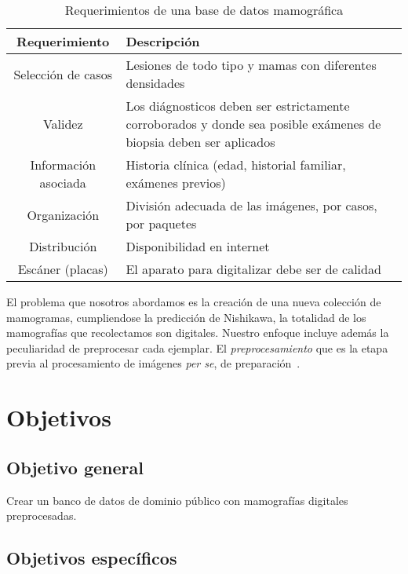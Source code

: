\begin{table}
  \caption[Requerimientos de una base de datos mamográfica]{Requerimientos de una base de datos mamográfica} 
  \label{features}
\begin{center}
{\small
    \begin{tabular}{c | >{\arraybackslash}m{3.5in}} 
    \hline 
    {\bf Requerimiento} & 
    {\bf Descripción} \\ 
    \hline
    Selección de casos   & Lesiones de todo tipo y mamas con diferentes densidades\\
    Validez              & Los diágnosticos deben ser estrictamente corroborados 
                           y donde sea posible exámenes de biopsia deben ser aplicados\\
    Información asociada & Historia clínica (edad, historial familiar, exámenes previos)\\
    Organización         & División adecuada de las imágenes, por casos, por paquetes\\
    Distribución         & Disponibilidad en internet\\
    Escáner (placas)     & El aparato para digitalizar debe ser de calidad\\
    \hline
    \end{tabular}
}
\end{center}
\end{table}

El problema que nosotros abordamos es la creación de una nueva colección de
mamogramas, cumpliendose la predicción de Nishikawa, la totalidad de los
mamografías que recolectamos son digitales. Nuestro enfoque incluye además la
peculiaridad de preprocesar cada ejemplar. El \textit{preprocesamiento} que es
la etapa previa al procesamiento de imágenes \textit{per se}, de
preparación~\cite{ponraj2011survey}. 

\section{Objetivos}

\subsection{Objetivo general} 

Crear un banco de datos de dominio público con mamografías digitales
preprocesadas.

\subsection{Objetivos específicos}

